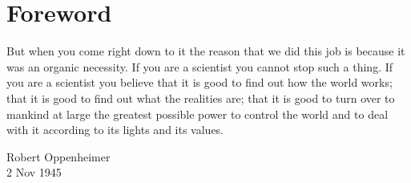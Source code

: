 \chapter*{Foreword}

\epigraph{
  But when you come right down to it the reason that we did this job is because
  it was an organic necessity. If you are a scientist you cannot stop such a thing.
  If you are a scientist you believe that it is good to find out how the world works;
  that it is good to find out what the realities are; that it is good to turn over
  to mankind at large the greatest possible power to control the world and to deal
  with it according to its lights and its values. 
}{Robert Oppenheimer\\2 Nov 1945}
